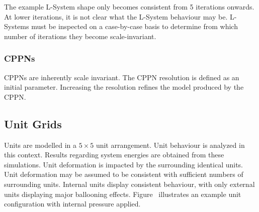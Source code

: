 The example L-System shape only becomes consistent from 5 iterations onwards. At lower iterations, it is not clear what the L-System behaviour may be. L-Systems must be inspected on a case-by-case basis to determine from which number of iterations they become scale-invariant.

\subsubsection{CPPNs}

CPPNs are inherently scale invariant. The CPPN resolution is defined as an initial parameter. Increasing the resolution refines the model produced by the CPPN.

\subsection{Unit Grids}

Units are modelled in a $5\times 5$ unit arrangement. Unit behaviour is analyzed in this context. Results regarding system energies are obtained from these simulations. Unit deformation is impacted by the surrounding identical units. Unit deformation may be assumed to be consistent with sufficient numbers of surrounding units. Internal units display consistent behaviour, with only external units displaying major ballooning effects. Figure~ illustrates an example unit configuration with internal pressure applied.